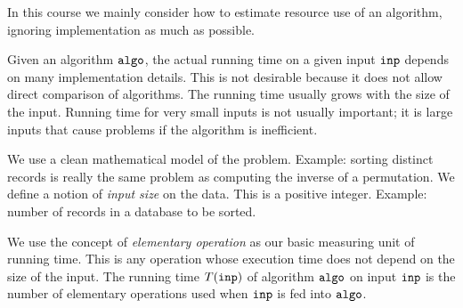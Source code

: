 In this course we mainly consider how to estimate resource use of an algorithm, 
ignoring implementation as much as possible.  

Given an algorithm $\algo$, the actual running time on a given
input $\inp$ depends on many implementation details. This is not desirable
because it does not allow direct comparison of algorithms. 
The running time usually grows with the size of the input.
Running time for very small inputs is not usually important; it is large
inputs that cause problems if the algorithm is inefficient. 

We use a clean mathematical model of the problem. Example: sorting 
distinct records is really the same problem as computing the inverse of a 
permutation. We define a notion of  \emph{input size} on the data. This is a positive integer. 
Example: number of records in a database to be sorted.

We use the concept of \emph{elementary operation} as our basic measuring 
unit of running time. This is any operation whose execution time does not depend on the size of the input.
The running time $T(\inp)$ of algorithm $\algo$ on input $\inp$ is the 
number of elementary operations used when $\inp$ is fed into $\algo$.



